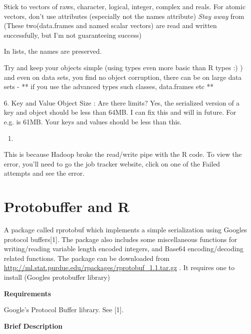 \documentclass[letterpaper,10pt,english]{manual}
\begin{document}
Stick to vectors of raws, character, logical, integer, complex and reals.  For
atomic vectors, don't use attributes (especially not the names attribute) \emph{Stay
away} from  (These two(data.frames and named scalar vectors) are
read and written successfully, but I'm not guaranteeing success)

In lists, the names are preserved.

Try and keep your objects simple (using types even more basic than R types :) ) and even on data sets, you find no object corruption, there can be on large data sets  - ** if you use the advanced types such classes, data.frames etc **

6. Key and Value Object Size : Are there limits?
Yes, the serialized version of a key and object should be less than 64MB. I can fix this and will in future. For e.g.  is 61MB. Your keys and values should be less than this.
\begin{enumerate}
\item {} 

\end{enumerate}

This is because Hadoop broke the read/write pipe with the R code. To view the error, you'll need to go the job tracker website, click on one of the Failed attempts and see the error.

\resetcurrentobjects
\hypertarget{--doc-ProtoBuffers}{}

\chapter{Protobuffer and R}

A package called rprotobuf which implements a simple serialization using Googles
protocol buffers{[}1{]}.  The package also includes some miscellaneous functions for
writing/reading variable length encoded integers, and Base64 encoding/decoding
related functions.  The package can be downloaded from
\href{http://ml.stat.purdue.edu/rpackages/rprotobuf\_1.1.tar.gz}{http://ml.stat.purdue.edu/rpackages/rprotobuf\_1.1.tar.gz} . It requires one to install 
(Googles protobuffer library)

\textbf{Requirements}

Google's Protocol Buffer library. See {[}1{]}.

\textbf{Brief Description}
\end{document}
